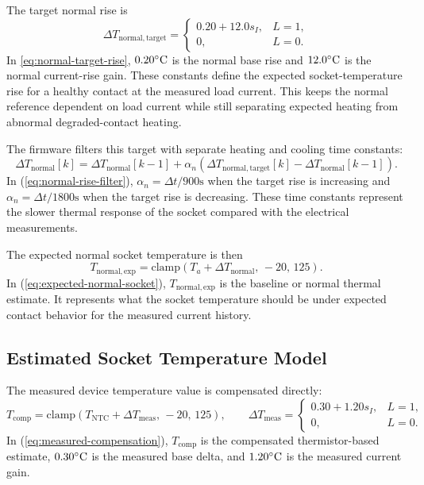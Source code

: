 The target normal rise is
\begin{equation}
  \Delta T_{\mathrm{normal,target}} =
  \begin{cases}
  0.20 + 12.0s_I, & L=1,\\
  0, & L=0 .
  \end{cases}
  \label{eq:normal-target-rise}
\end{equation}
In \eqref{eq:normal-target-rise}, $0.20^\circ\mathrm{C}$ is the normal base rise and
$12.0^\circ\mathrm{C}$ is the normal current-rise gain. These constants define the
expected socket-temperature rise for a healthy contact at the measured load
current. This keeps the normal reference dependent on load current while still
separating expected heating from abnormal degraded-contact heating.

The firmware filters this target with separate heating and cooling time
constants:
\begin{equation}
  \Delta T_{\mathrm{normal}}[k]
  =
  \Delta T_{\mathrm{normal}}[k-1]
  +
  \alpha_n\left(
  \Delta T_{\mathrm{normal,target}}[k] -
  \Delta T_{\mathrm{normal}}[k-1]\right).
  \label{eq:normal-rise-filter}
\end{equation}
In (\ref{eq:normal-rise-filter}), $\alpha_n=\Delta t/900\mathrm{s}$ when the
target rise is increasing and $\alpha_n=\Delta t/1800\mathrm{s}$ when the
target rise is decreasing. These time constants represent the slower thermal
response of the socket compared with the electrical measurements.

The expected normal socket temperature is then
\begin{equation}
  T_{\mathrm{normal,exp}} =
  \mathrm{clamp}
  \left(T_a + \Delta T_{\mathrm{normal}},\, -20,\,125\right).
  \label{eq:expected-normal-socket}
\end{equation}
In (\ref{eq:expected-normal-socket}), $T_{\mathrm{normal,exp}}$ is the
baseline or normal thermal estimate. It represents what the socket temperature
should be under expected contact behavior for the measured current history.

\subsection{Estimated Socket Temperature Model}
\label{sec:ch3-estimated-socket-temperature-model}

The measured device temperature value is compensated directly:
\begin{equation}
  T_{\mathrm{comp}} =
  \mathrm{clamp}
  \left(T_{\mathrm{NTC}} + \Delta T_{\mathrm{meas}},\, -20,\,125\right),
  \qquad
  \Delta T_{\mathrm{meas}} =
  \begin{cases}
  0.30 + 1.20s_I, & L=1,\\
  0, & L=0 .
  \end{cases}
  \label{eq:measured-compensation}
\end{equation}
In (\ref{eq:measured-compensation}), $T_{\mathrm{comp}}$ is the compensated
thermistor-based estimate, $0.30^\circ\mathrm{C}$ is the measured base delta, and
$1.20^\circ\mathrm{C}$ is the measured current gain.

